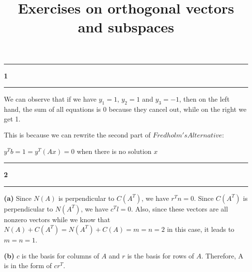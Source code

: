\documentclass[11pt]{article}
\newcommand\question[2]{\vspace{.25in}\hrule\textbf{#1 #2}\vspace{.5em}\hrule\vspace{.10in}}
\renewcommand\part[1]{\vspace{.10in}\textbf{(#1)}}
\begin{document}
\raggedright
\newcommand\NAME{Haiying Cui}  %
\newcommand\ANDREWID{Christy}     %
\newcommand\HWNUM{14}              %

\title{Exercises on orthogonal vectors and subspaces}
\maketitle

\question{1}{}
We can observe that if we have \(y_1 = 1\), \(y_2 = 1\) and \(y_3 = -1\), then on the left hand, the sum of all equations is 0 because they cancel out, while on the right we get 1. 

This is because we can rewrite the second part of \(Fredholm's Alternative\):

\(y^Tb = 1 = y^T(Ax) = 0\) when there is no solution \(x\)

\question{2}{}
\part{a}{}
Since \(N(A)\) is perpendicular to \(C(A^T)\), we have \(r^Tn = 0\). Since \(C(A^T)\) is perpendicular to \(N(A^T)\), we have \(c^Tl = 0\). Also, since these vectors are all nonzero vectors while we know that \(N(A) + C(A^T) = N(A^T) + C(A) = m = n = 2\) in this case, it leads to \(m = n = 1\).

\part{b}{}
\(c\) is the basis for columns of \(A\) and \(r\) is the basis for rows of \(A\). Therefore, A is in the form of \(cr^T\).
\end{document}
